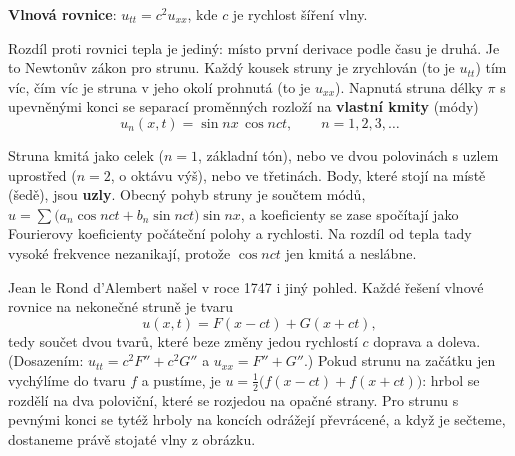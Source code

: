\begin{definitionbox}
  \textbf{Vlnová rovnice}: $u_{tt} = c^2u_{xx}$, kde $c$ je rychlost šíření vlny.
\end{definitionbox}

Rozdíl proti rovnici tepla je jediný: místo první derivace podle času je druhá. Je to Newtonův zákon pro strunu. Každý kousek struny je zrychlován (to je $u_{tt}$) tím víc, čím víc je struna v jeho okolí prohnutá (to je $u_{xx}$). Napnutá struna délky $\pi$ s upevněnými konci se separací proměnných rozloží na \textbf{vlastní kmity} (módy)
\begin{equation*}
  u_n(x, t) = \sin nx\,\cos nct,\qquad n = 1, 2, 3, \dots
\end{equation*}

\begin{center}
\end{center}

Struna kmitá jako celek ($n = 1$, základní tón), nebo ve dvou polovinách s uzlem uprostřed ($n = 2$, o oktávu výš), nebo ve třetinách. Body, které stojí na místě (šedě), jsou \textbf{uzly}. Obecný pohyb struny je součtem módů, $u = \sum\big(a_n\cos nct + b_n\sin nct\big)\sin nx$, a koeficienty se zase spočítají jako Fourierovy koeficienty počáteční polohy a rychlosti. Na rozdíl od tepla tady vysoké frekvence nezanikají, protože $\cos nct$ jen kmitá a neslábne.

Jean le Rond d'Alembert našel v roce 1747 i jiný pohled. Každé řešení vlnové rovnice na nekonečné struně je tvaru
\begin{equation*}
  u(x, t) = F(x - ct) + G(x + ct),
\end{equation*}
tedy součet dvou tvarů, které beze změny jedou rychlostí $c$ doprava a doleva. (Dosazením: $u_{tt} = c^2F'' + c^2G''$ a $u_{xx} = F'' + G''$.) Pokud strunu na začátku jen vychýlíme do tvaru $f$ a pustíme, je $u = \frac{1}{2}\big(f(x - ct) + f(x + ct)\big)$: hrbol se rozdělí na dva poloviční, které se rozjedou na opačné strany. Pro strunu s pevnými konci se tytéž hrboly na koncích odrážejí převrácené, a když je sečteme, dostaneme právě stojaté vlny z obrázku.

